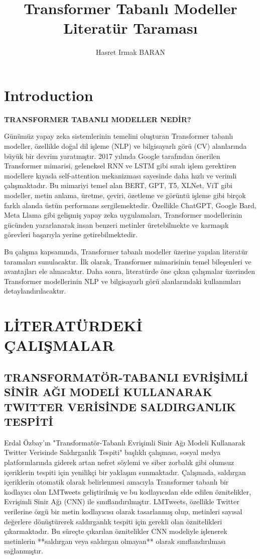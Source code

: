 \documentclass{article}
\title{Transformer Tabanlı Modeller Literatür Taraması}
\author{Hasret Irmak BARAN}
\begin{document}
\maketitle



\section{Introduction}

\textbf{TRANSFORMER TABANLI MODELLER NEDİR?}

Günümüz yapay zeka sistemlerinin temelini oluşturan Transformer tabanlı modeller, özellikle doğal dil işleme (NLP) ve bilgisayarlı görü (CV) alanlarında büyük bir devrim yaratmıştır. 2017 yılında Google tarafından önerilen Transformer mimarisi, geleneksel RNN ve LSTM gibi sıralı işlem gerektiren modellere kıyasla self-attention mekanizması sayesinde daha hızlı ve verimli çalışmaktadır. Bu mimariyi temel alan BERT, GPT, T5, XLNet, ViT gibi modeller, metin anlama, üretme, çeviri, özetleme ve görüntü işleme gibi birçok farklı alanda üstün performans sergilemektedir. Özellikle ChatGPT, Google Bard, Meta Llama gibi gelişmiş yapay zeka uygulamaları, Transformer modellerinin gücünden yararlanarak insan benzeri metinler üretebilmekte ve karmaşık görevleri başarıyla yerine getirebilmektedir.

Bu çalışma kapsamında, Transformer tabanlı modeller üzerine yapılan literatür taramaları sunulacaktır. İlk olarak, Transformer mimarisinin temel bileşenleri ve avantajları ele alınacaktır. Daha sonra, literatürde öne çıkan çalışmalar üzerinden Transformer modellerinin NLP ve bilgisayarlı görü alanlarındaki kullanımları detaylandırılacaktır.

\section{LİTERATÜRDEKİ ÇALIŞMALAR}

\subsection{TRANSFORMATÖR-TABANLI EVRİŞİMLİ SİNİR AĞI MODELİ KULLANARAK TWITTER 
VERİSİNDE SALDIRGANLIK TESPİTİ}

Erdal Özbay’ın "Transformatör-Tabanlı Evrişimli Sinir Ağı Modeli Kullanarak Twitter Verisinde Saldırganlık Tespiti"\cite{ozbay2022aggression} başlıklı çalışması, sosyal medya platformlarında giderek artan nefret söylemi ve siber zorbalık gibi olumsuz içeriklerin tespiti için yenilikçi bir yaklaşım sunmaktadır. Çalışmada, saldırgan içeriklerin otomatik olarak belirlenmesi amacıyla Transformer tabanlı bir kodlayıcı olan LMTweets geliştirilmiş ve bu kodlayıcıdan elde edilen öznitelikler, Evrişimli Sinir Ağı (CNN) ile sınıflandırılmıştır. LMTweets, özellikle Twitter verilerine özgü bir metin kodlayıcısı olarak tasarlanmış olup, metinleri sayısal değerlere dönüştürerek saldırganlık tespiti için gerekli olan öznitelikleri çıkarmaktadır. Bu süreçte çıkarılan öznitelikler CNN modeliyle işlenerek metinlerin **saldırgan veya saldırgan olmayan** olarak sınıflandırılması sağlanmıştır.  
\end{document}
